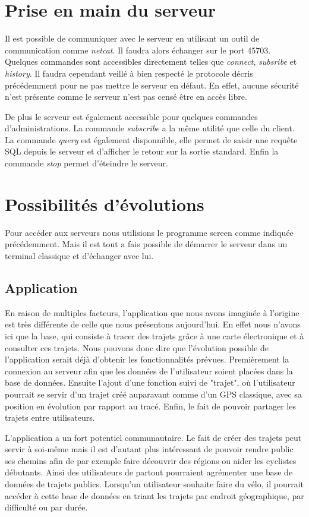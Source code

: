 \newpage
\section{Prise en main du serveur}
Il est possible de communiquer avec le serveur en utilisant un outil de communication comme \emph{netcat}. Il faudra alors échanger sur le port 45703. Quelques commandes sont accessibles directement telles que \emph{connect}, \emph{subsribe} et \emph{history}. Il faudra cependant veillé à bien respecté le protocole décris précédemment pour ne pas mettre le serveur en défaut. En effet, aucune sécurité n'est présente comme le serveur n'est pas censé être en accès libre.
\par
De plus le serveur est également accessible pour quelques commandes d'administrations. La commande \emph{subscribe} a la même utilité que celle du client.
La commande \emph{query} est également disponnible, elle permet de saisir une requête SQL depuis le serveur et d'afficher le retour sur la sortie standard. Enfin la commande \emph{stop} permet d'éteindre le serveur.
\section{Possibilités d'évolutions}
\par
Pour accéder aux serveurs nous utilisions le programme screen comme indiquée précédemment. Mais il est tout a fais possible de démarrer le serveur dans un terminal classique et d'échanger avec lui.
\subsection{Application}
En raison de multiples facteurs, l'application que nous avons imaginée à l'origine est très différente de celle que nous présentons aujourd'hui.
En effet nous n'avons ici que la base, qui consiste à tracer des trajets grâce à une carte électronique et à consulter ces trajets. Nous pouvons
donc dire que l'évolution possible de l'application serait déjà d'obtenir les fonctionnalités prévues. Premièrement la connexion au serveur
afin que les données de l'utilisateur soient placées dans la base de données. Ensuite l'ajout d'une fonction suivi de "trajet", où l'utilisateur
pourrait se servir d'un trajet créé auparavant comme d'un GPS classique, avec sa position en évolution par rapport au tracé. Enfin, le fait
de pouvoir partager les trajets entre utilisateurs.

L'application a un fort potentiel communautaire. Le fait de créer des trajets peut servir à soi-même mais il est d'autant plus intéressant
de pouvoir rendre public ses chemins afin de par exemple faire découvrir des régions ou aider les cyclistes débutants. Ainsi des utilisateurs
de partout pourraient agrémenter une base de données de trajets publics. Lorsqu'un utilisateur souhaite faire du vélo, il pourrait accéder
à cette base de données en triant les trajets par endroit géographique, par difficulté ou par durée.


